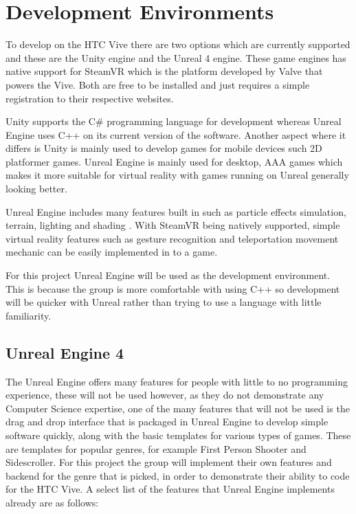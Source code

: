
\section{Development Environments}
To develop on the HTC Vive there are two options which are currently supported and these are the Unity engine and the Unreal 4 engine. These game engines has native support for SteamVR which is the platform developed by Valve that powers the Vive. Both are free to be installed and just requires a simple registration to their respective websites.
\newline
\par
Unity supports the C\# programming language for development whereas Unreal Engine uses C++ on its current version of the software. Another aspect where it differs is Unity is mainly used to develop games for mobile devices such 2D platformer games. Unreal Engine is mainly used for desktop, AAA games which makes it more suitable for virtual reality with games running on Unreal generally looking better.
\newline
\par
Unreal Engine includes many features built in such as particle effects simulation, terrain, lighting and shading \cite{unrealfeatures}. With SteamVR being natively supported, simple virtual reality features such as gesture recognition and teleportation movement mechanic can be easily implemented in to a game.
\newline
\par
For this project Unreal Engine will be used as the development environment. This is because the group is more comfortable with using C++ so development will be quicker with Unreal rather than trying to use a language with little familiarity.

\subsection{Unreal Engine 4}
The Unreal Engine offers many features for people with little to no programming experience, these will not be used however, as they do not demonstrate any Computer Science expertise, one of the many features that will not be used is the drag and drop interface that is packaged in Unreal Engine to develop simple software quickly, along with the basic templates for various types of games. These are templates for popular genres, for example First Person Shooter and Sidescroller. For this project the group will implement their own features and backend for the genre that is picked, in order to demonstrate their ability to code for the HTC Vive. A select list of the features that Unreal Engine implements already are as follows:

